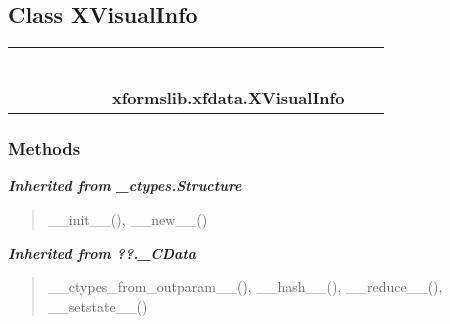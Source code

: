 
\subsection{Class XVisualInfo}

    \label{xformslib:xfdata:XVisualInfo}
\begin{tabular}{cccccccccc}
\multicolumn{2}{r}{\settowidth{\BCL}{object}\multirow{2}{\BCL}{object}}
&&
&&
&&
  \\\cline{3-3}
  &&\multicolumn{1}{c|}{}
&&
&&
&&
  \\
\multicolumn{4}{r}{\settowidth{\BCL}{??.\_CData}\multirow{2}{\BCL}{??.\_CData}}
&&
&&
  \\\cline{5-5}
  &&&&\multicolumn{1}{c|}{}
&&
&&
  \\
\multicolumn{6}{r}{\settowidth{\BCL}{\_ctypes.Structure}\multirow{2}{\BCL}{\_ctypes.Structure}}
&&
  \\\cline{7-7}
  &&&&&&\multicolumn{1}{c|}{}
&&
  \\
&&&&&&\multicolumn{2}{l}{\textbf{xformslib.xfdata.XVisualInfo}}
\end{tabular}



  \subsubsection{Methods}


\large{\textbf{\textit{Inherited from \_ctypes.Structure}}}

\begin{quote}
\_\_init\_\_(), \_\_new\_\_()
\end{quote}

\large{\textbf{\textit{Inherited from ??.\_CData}}}

\begin{quote}
\_\_ctypes\_from\_outparam\_\_(), \_\_hash\_\_(), \_\_reduce\_\_(), \_\_setstate\_\_()
\end{quote}

